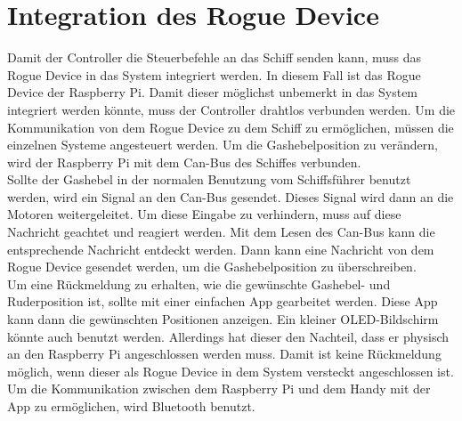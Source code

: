 \section{Integration des Rogue Device}
Damit der Controller die Steuerbefehle an das Schiff senden kann, muss das Rogue Device in das System integriert werden.
In diesem Fall ist das Rogue Device der Raspberry Pi. Damit dieser möglichst unbemerkt in das System integriert werden könnte,
muss der Controller drahtlos verbunden werden. Um die Kommunikation von dem Rogue Device zu dem Schiff zu ermöglichen, müssen
die einzelnen Systeme angesteuert werden. Um die Gashebelposition zu verändern, wird der Raspberry Pi mit dem Can-Bus des Schiffes
verbunden. 
\\
Sollte der Gashebel in der normalen Benutzung vom Schiffsführer benutzt werden, wird ein Signal an den Can-Bus gesendet. Dieses Signal wird dann an die Motoren weitergeleitet.
Um diese Eingabe zu verhindern, muss auf diese Nachricht geachtet und reagiert werden. Mit dem Lesen des Can-Bus kann die 
entsprechende Nachricht entdeckt werden. Dann kann eine Nachricht von dem Rogue Device gesendet werden, um die Gashebelposition
zu überschreiben.
\\
Um eine Rückmeldung zu erhalten, wie die gewünschte Gashebel- und Ruderposition ist, sollte mit einer einfachen App
gearbeitet werden. Diese App kann dann die gewünschten Positionen anzeigen. Ein kleiner OLED-Bildschirm könnte auch benutzt 
werden. Allerdings hat dieser den Nachteil, dass er physisch an den Raspberry Pi angeschlossen werden muss. Damit 
ist keine Rückmeldung möglich, wenn dieser als Rogue Device in dem System versteckt angeschlossen ist.
Um die Kommunikation zwischen dem Raspberry Pi und dem Handy mit der App zu ermöglichen, wird Bluetooth benutzt.


